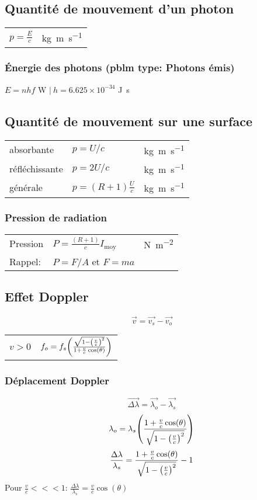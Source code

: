 \subsection{Quantité de mouvement d'un photon}
\begin{center}
\begin{tabular}{ll}
    \(p=\frac{E}{c}\) & \si{\kilo \gram \meter\per\second}
\end{tabular}
\subsubsection{Énergie des photons (pblm type: Photons émis)}
\(E = nhf\) \si{\watt} \(|\ h=6.625\times10^{-34} \) \si{\J\second}\\
\end{center}
\subsection{Quantité de mouvement sur une surface}
\begin{tabular}{lll}
    absorbante &  \(p=U/c\) & \si{\kilo \gram \meter\per\second}\\
    réfléchissante & \(p=2U/c\) & \si{\kilo \gram \meter\per\second}\\
    générale & \(p=(R+1)\frac{U}{c}\) & \si{\kilo \gram \meter\per\second}
\end{tabular}

\subsubsection{Pression de radiation}
\begin{tabular}{lll}
    Pression & \(P=\frac{(R+1)}{c}I_{\text{moy}}\) & \si{\newton\per\meter\squared}\\[5pt]
    \hfill Rappel: & \(P=F/A\) et \(F=ma\) &
\end{tabular}


\subsection{Effet Doppler}

\[\vec{v}=\vec{v_s}-\vec{v_o}\]
\begin{tabular}{ll}
    \(v>0\) &  \(f_o=f_s\qty(\frac{\sqrt{1-\qty(\frac{v}{c})^2}}{1+\frac{v}{c}\cos (\theta)})\)
\end{tabular}

\subsubsection{Déplacement Doppler}
\[\vec{\Delta\lambda}=\vec{\lambda_o}-\vec{\lambda_s}\]
\[\lambda_o=\lambda_s\qty(\frac{1+\frac{v}{c}\cos (\theta)}{\sqrt{1-\qty(\frac{v}{c})^2}})\]
\[\frac{ \Delta\lambda }{\lambda_s}=\frac{1+\frac{v}{c}\cos (\theta)}{\sqrt{1-\qty(\frac{v}{c})^2}}-1\]
Pour \(\frac{v}{c} <<< 1\): \(\frac{\Delta \lambda}{\lambda_s}=\frac{v}{c}\cos (\theta)\)